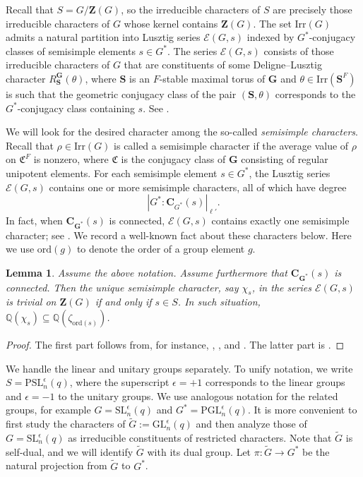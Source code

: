 \documentclass[12pt]{amsart}
\newtheorem{lemma}[theorem]{Lemma}
\theoremstyle{definition}
\numberwithin{equation}{section}
\newcommand{\GL}{{\mathrm {GL}}}
\newcommand{\PGL}{{\mathrm {PGL}}}
\newcommand{\SL}{{\mathrm {SL}}}
\newcommand{\PSL}{{\mathrm {PSL}}}
\newcommand{\Irr}{{\mathrm {Irr}}}
\newcommand{\ord}{{\mathrm {ord}}}
\newcommand{\QQ}{{\mathbb Q}}
\newcommand{\EC}{\mathcal{E}}
\newcommand{\bC}{{\mathbf{C}}}
\newcommand{\bG}{{\mathbf{G}}}
\newcommand{\bS}{{\mathbf{S}}}
\newcommand{\bZ}{{\mathbf{Z}}}
\begin{document}
Recall that $S=G/\bZ(G)$, so the irreducible characters of $S$ are
precisely those irreducible characters of $G$ whose kernel contains
$\bZ(G)$. The set $\Irr(G)$ admits a natural partition into Lusztig
series $\EC(G,s)$ indexed by $G^\ast$-conjugacy classes of
semisimple elements $s\in G^\ast$. The series $\EC(G,s)$ consists of
those irreducible characters of $G$ that are constituents of some
Deligne--Lusztig character $R_{\bS}^{\bG}(\theta)$, where $\bS$ is
an $F$-stable maximal torus of $\bG$ and $\theta\in\Irr(\bS^F)$ is
such that the geometric conjugacy class of the pair $(\bS,\theta)$
corresponds to the $G^\ast$-conjugacy class containing $s$. See
\cite[\S2.6]{GeckMalle}.

We will look for the desired character among the so-called
\emph{semisimple characters}. Recall that \(\rho \in \Irr(G)\) is
called a semisimple character if the average value of \(\rho\) on
\(\mathfrak{C}^F\) is nonzero, where \(\mathfrak{C}\) is the
conjugacy class of \(\bG\) consisting of regular unipotent elements.
For each semisimple element \(s \in G^*\), the Lusztig series
\(\EC(G,s)\) contains one or more semisimple characters, all of
which have degree
\[
|G^* : \bC_{G^*}(s)|_{\ell'}.
\]
In fact, when \(\bC_{\bG^*}(s)\) is connected, \(\EC(G,s)\) contains
exactly one semisimple character; see \cite[p.~171]{GeckMalle}. We
record a well-known fact about these characters below. Here we use
$\ord(g)$ to denote the order of a group element $g$.

\begin{lemma}\label{lem:1}
Assume the above notation. Assume furthermore that $\bC_{\bG^*}(s)$
is connected. Then the unique semisimple character, say $\chi_s$, in
the series \(\EC(G,s)\) is trivial on $\bZ(G)$ if and only if $s\in
S$. In such situation, $\QQ(\chi_s)\subseteq \QQ(\zeta_{\ord(s)})$.
\end{lemma}

\begin{proof}
The first part follows from, for instance,
\cite[Proposition~24.21]{malletesterman}, \cite[Lemma~2.2]{M07}, and
\cite[Lemma~5.8]{Hung22}. The latter part is
\cite[Lemma~4.2]{GHSV21}.
\end{proof}

We handle the linear and unitary groups separately. To unify
notation, we write $S=\PSL_n^\epsilon(q)$, where the superscript
$\epsilon=+1$ corresponds to the linear groups and $\epsilon=-1$ to
the unitary groups. We use analogous notation for the related
groups, for example $G=\SL_n^\epsilon(q)$ and
$G^*=\PGL_n^\epsilon(q)$. It is more convenient to first study the
characters of $\widetilde{G}:=\GL_n^\epsilon(q)$ and then analyze
those of $G=\SL_n^\epsilon(q)$ as irreducible constituents of
restricted characters. Note that $\widetilde{G}$ is self-dual, and
we will identify $\widetilde{G}$ with its dual group. Let
$\pi:\widetilde{G}\to G^*$ be the natural projection from
$\widetilde{G}$ to $G^*$.
\end{document}
